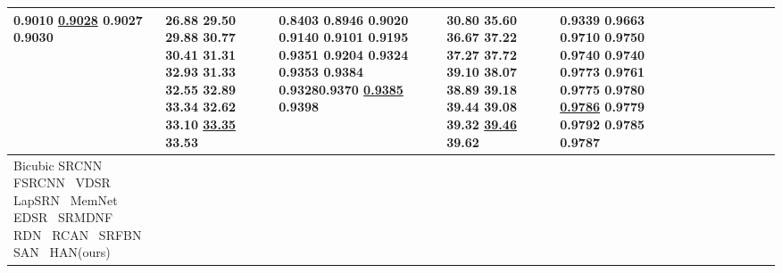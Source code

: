\documentclass[runningheads]{llncs}
\begin{document}
\begin{table}[!ht]
\begin{tabular}{|p{7em}|p{2.5em}|p{2.5em}|p{3em}|p{2.5em}|p{3em}|p{2.5em}|p{3em}|p{2.5em}|p{3em}|p{2.5em}|p{3em}|}
 \newline{}0.9010 \newline{}\underline{0.9028} \newline{}0.9027 \newline{}\bfseries{0.9030} & 26.88 \newline{}29.50 \newline{}29.88 \newline{}30.77 \newline{}30.41 \newline{}31.31 \newline{}32.93 \newline{}31.33 \newline{}32.55 \newline{}32.89 \newline{}33.34 \newline{}32.62 \newline{}33.10 \newline{}\underline{33.35} \newline{}\bfseries{33.53} & 0.8403 \newline{}0.8946 \newline{}0.9020 \newline{}0.9140 \newline{}0.9101 \newline{}0.9195 \newline{}0.9351 \newline{}0.9204 \newline{}0.9324 \newline{}0.9353 \newline{}0.9384 \newline{}0.9328\newline{}0.9370 \newline{}\underline{0.9385} \newline{}\bfseries{0.9398}  & 30.80 \newline{}35.60 \newline{}36.67 \newline{}37.22 \newline{}37.27 \newline{}37.72 \newline{}39.10 \newline{}38.07 \newline{}38.89 \newline{}39.18 \newline{}39.44 \newline{}39.08 \newline{}39.32 \newline{}\underline{39.46} \newline{}\bfseries{39.62} & 0.9339 \newline{}0.9663 \newline{}0.9710 \newline{}0.9750 \newline{}0.9740 \newline{}0.9740 \newline{}0.9773 \newline{}0.9761 \newline{}0.9775 \newline{}0.9780 \newline{}\underline{0.9786} \newline{}0.9779 \newline{}0.9792 \newline{}0.9785 \newline{}\bfseries{0.9787} \\
		\hline
		\hline
		Bicubic \newline{}SRCNN~\cite{dong2014learning} \newline{} FSRCNN~\cite{dong2016accelerating} \newline{} VDSR~\cite{kim2016accurate} \newline{} LapSRN~\cite{lai2017deep} \newline{} MemNet~\cite{tai2017memnet} \newline{} EDSR~\cite{lim2017enhanced} \newline{} SRMDNF~\cite{zhang2018learning}  \newline{} RDN~\cite{zhang2018residual} \newline{} RCAN~\cite{zhang2018image} \newline{} SRFBN~\cite{li2019feedback} \newline{} SAN~\cite{dai2019second} \newline{} HAN(ours) \n
\end{tabular}
\end{table}
\end{document}
